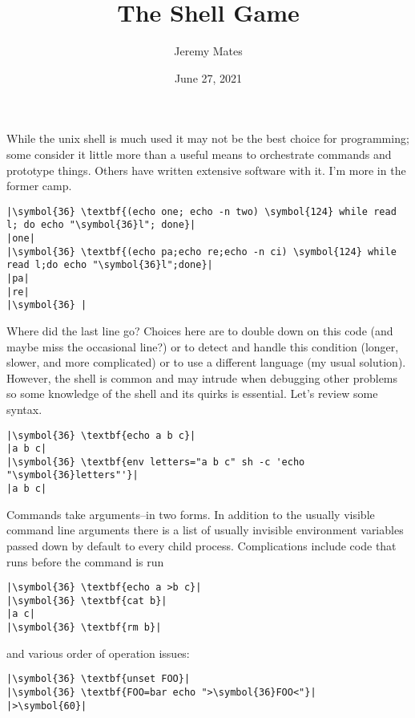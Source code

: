\documentclass[10pt,a4paper]{article}
\title{The Shell Game}
\author{Jeremy Mates}
\date{June 27, 2021}
\begin{document}
\renewcommand{\thefootnote}{\alph{footnote}}

\maketitle

While the unix shell is much used it may not be the best choice for
programming; some consider it little more than a useful means to
orchestrate commands and prototype things. Others have written extensive
software with it. I'm more in the former camp.

\begin{lstlisting}
|\symbol{36} \textbf{(echo one; echo -n two) \symbol{124} while read l; do echo "\symbol{36}l"; done}|
|one|
|\symbol{36} \textbf{(echo pa;echo re;echo -n ci) \symbol{124} while read l;do echo "\symbol{36}l";done}|
|pa|
|re|
|\symbol{36} |
\end{lstlisting}

Where did the last line go? Choices here are to double down on this code
(and maybe miss the occasional line?) or to detect and handle this
condition (longer, slower, and more complicated) or to use a different
language (my usual solution). However, the shell is common and may
intrude when debugging other problems so some knowledge of the shell and
its quirks is essential. Let's review some syntax.

\begin{lstlisting}
|\symbol{36} \textbf{echo a b c}|
|a b c|
|\symbol{36} \textbf{env letters="a b c" sh -c 'echo "\symbol{36}letters"'}|
|a b c|
\end{lstlisting}

Commands take arguments--in two forms. In addition to the usually
visible command line arguments there is a list of usually invisible
environment variables passed down by default to every child process.
Complications include code that runs before the command is run

\begin{lstlisting}
|\symbol{36} \textbf{echo a >b c}|
|\symbol{36} \textbf{cat b}|
|a c|
|\symbol{36} \textbf{rm b}|
\end{lstlisting}

and various order of operation issues:

\begin{lstlisting}
|\symbol{36} \textbf{unset FOO}|
|\symbol{36} \textbf{FOO=bar echo ">\symbol{36}FOO<"}|
|>\symbol{60}|
\end{lstlisting}
\end{document}
